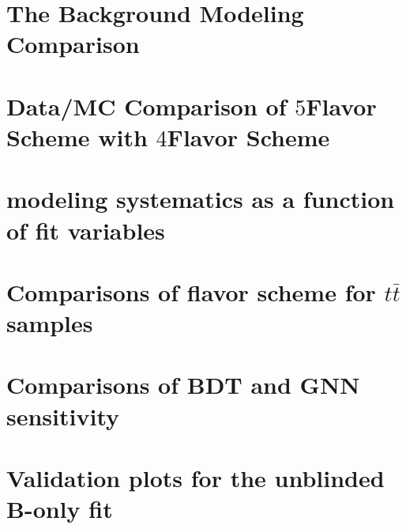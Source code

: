 \documentclass[NOTE, atlasdraft=true, texlive=2016, UKenglish]{atlasdoc}
\begin{document}
\section{The Background Modeling Comparison}
\label{app:background_modeling_comp}


\FloatBarrier
\section{Data/MC Comparison of $5$Flavor Scheme with $4$Flavor Scheme}
\label{app:4FS_vs_5FS}


\FloatBarrier
\section{\ttbar modeling systematics as a function of fit variables}
\label{app:TTB_modeling}


\FloatBarrier
\section{Comparisons of flavor scheme for $t\bar{t}$ samples}
\label{app:FS_studies}


\FloatBarrier
\section{Comparisons of BDT and GNN sensitivity}
\label{app:BDTvsGNN}

\FloatBarrier
\section{Validation plots for the unblinded B-only fit}
\label{app:validation_region_studies}

\FloatBarrier
\end{document}
